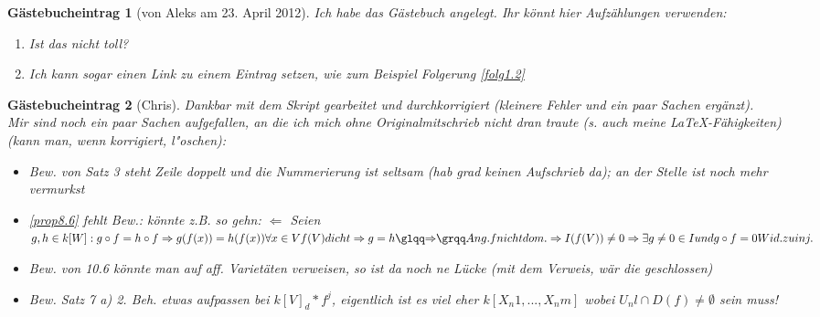 \documentclass[a4paper, 12pt, numbers=noendperiod, chapterprefix=true, headsepline]{scrbook}
\theoremstyle{break}
\theoremstyle{nonumberbreak}
\newtheorem{gast}{G\"astebucheintrag}
\theoremstyle{nonumberplain}
\newcommand{\quot}[1]{\textrm{\glqq}{#1}\textrm{\grqq}}
\begin{document}
\begin{gast}[von Aleks am 23. April 2012]
Ich habe das G\"astebuch angelegt. Ihr k\"onnt hier Aufz\"ahlungen verwenden:
\begin{enumerate}[1)]
\item
	Ist das nicht toll?
\item
	Ich kann sogar einen Link zu einem Eintrag setzen, wie zum Beispiel Folgerung \ref{folg1.2}
\end{enumerate}
\end{gast}

\begin{gast}[Chris]
Dankbar mit dem Skript gearbeitet und durchkorrigiert (kleinere Fehler und ein paar Sachen erg\"anzt).\\
Mir sind noch ein paar Sachen aufgefallen, an die ich mich ohne Originalmitschrieb nicht dran traute (s. auch meine LaTeX-F\"ahigkeiten) (kann man, wenn korrigiert, l"oschen):
\begin{itemize}
\item Bew. von Satz 3 steht Zeile doppelt und die Nummerierung ist seltsam (hab grad keinen Aufschrieb da); an der Stelle ist noch mehr vermurkst
\item \ref{prop8.6} fehlt Bew.: k\"onnte z.B. so gehn: \quot{$ \Leftarrow $} Seien $g,h \in k[W]: g \circ f=h \circ f \Rightarrow g(f(x))=h(f(x)) \forall x \in V f(V) dicht \Rightarrow g=h    \quot{\Rightarrow} Ang. f nicht dom. \Rightarrow I(f(V))\neq {0} \Rightarrow \exists g \neq 0 \in I und g \circ f=0 Wid. zu inj.$
\item Bew. von 10.6 k\"onnte man auf aff. Variet\"aten verweisen, so ist da noch ne L\"ucke (mit dem Verweis, w\"ar die geschlossen)
\item Bew. Satz 7 a) 2. Beh. etwas aufpassen bei $k[V]_d * f^j$, eigentlich ist es viel eher $k[X_n1,...,X_nm]$ wobei $U_nl \cap D(f) \neq \emptyset$ sein muss!
\end{itemize}
\end{gast}
\end{document}

